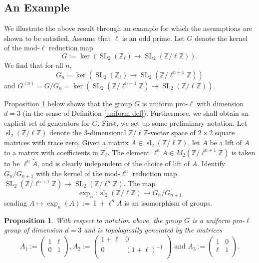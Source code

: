 \documentclass[11pt]{amsart}
\newtheorem{proposition}[theorem]{Proposition}
\numberwithin{equation}{section}
\theoremstyle{remark}
\newcommand{\Z}{\mathbb{Z}}
\newcommand{\op}[1]{\operatorname{#1}}
\newcommand\mtx[4] { \left( {\begin{array}{cc}
 #1 & #2 \\
 #3 & #4 \\
 \end{array} } \right)}
\begin{document}
\subsection{An Example}\label{section 5.2}
We illustrate the above result through an example for which the assumptions are shown to be satisfied. Assume that $\ell$ is an odd prime. Let $G$ denote the kernel of the mod-$\ell$ reduction map 
\[G:=\op{ker}\left(\op{SL}_2(\Z_\ell)\rightarrow \op{SL}_2(\Z/\ell\Z)\right).\]
We find that for all $n$, \[G_n=\op{ker}\left(\op{SL}_2(\Z_\ell)\rightarrow \op{SL}_2(\Z/\ell^{n+1}\Z)\right)\]
and $G^{(n)}=G/G_n=\op{ker}\left(\op{SL}_2(\Z/\ell^{n+1}\Z)\rightarrow \op{SL}_2(\Z/\ell\Z)\right)$.
\par Proposition \ref{last prop} below shows that the group $G$ is uniform pro-$\ell$ with dimension $d=3$ (in the sense of Definition \ref{uniform def}). Furthermore, we shall obtain an explicit set of generators for $G$. First, we set up some preliminary notation. Let $\op{sl}_2(\Z/\ell\Z)$ denote the $3$-dimensional $\Z/\ell\Z$-vector space of $2\times 2$ square matrices with trace zero. Given a matrix $A\in \op{sl}_2(\Z/\ell\Z)$, let $\widetilde{A}$ be a lift of $A$ to a matrix with coefficients in $\Z_\ell$. The element $\ell^n A\in M_2(\Z/\ell^{n+1}\Z)$ is taken to be $\ell^n \widetilde{A}$, and is clearly independent of the choice of lift of $A$. Identify $G_n/G_{n+1}$ with the kernel of the mod-$\ell^n$ reduction map $\op{SL}_2(\Z/\ell^{n+1}\Z)\rightarrow \op{SL}_2(\Z/\ell^n\Z)$. The map \[\op{exp}_n:\op{sl}_2(\Z/\ell\Z)\rightarrow G_n/G_{n+1}\] sending $A\mapsto \op{exp}_n(A):=\op{I}+\ell^n A$ is an isomorphism of groups.
\begin{proposition}\label{last prop}
    With respect to notation above, the group $G$ is a uniform pro-$\ell$ group of dimension $d=3$ and is topologically generated by the matrices \[A_1:=\mtx{1}{\ell}{0}{1}, A_2:=\mtx{1+\ell}{0}{0}{(1+\ell)^{-1}}\text{ and }A_3:=\mtx{1}{0}{\ell}{1}.\]
\end{proposition}
\end{document}
